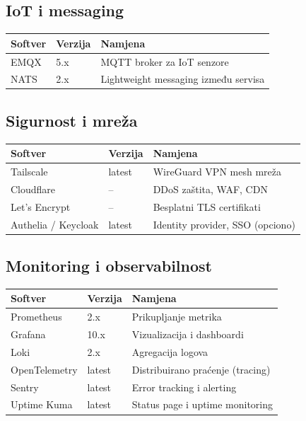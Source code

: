 \documentclass{article}
\begin{document}
\subsection{IoT i messaging}

\begin{center}
\begin{tabular}{|l|l|l|}
\hline
\rowcolor{lightgray}
\textbf{Softver} & \textbf{Verzija} & \textbf{Namjena} \\
\hline
EMQX & 5.x & MQTT broker za IoT senzore \\
\hline
NATS & 2.x & Lightweight messaging između servisa \\
\hline
\end{tabular}
\end{center}

\subsection{Sigurnost i mreža}

\begin{center}
\begin{tabular}{|l|l|l|}
\hline
\rowcolor{lightgray}
\textbf{Softver} & \textbf{Verzija} & \textbf{Namjena} \\
\hline
Tailscale & latest & WireGuard VPN mesh mreža \\
\hline
Cloudflare & -- & DDoS zaštita, WAF, CDN \\
\hline
Let's Encrypt & -- & Besplatni TLS certifikati \\
\hline
Authelia / Keycloak & latest & Identity provider, SSO (opciono) \\
\hline
\end{tabular}
\end{center}

\subsection{Monitoring i observabilnost}

\begin{center}
\begin{tabular}{|l|l|l|}
\hline
\rowcolor{lightgray}
\textbf{Softver} & \textbf{Verzija} & \textbf{Namjena} \\
\hline
Prometheus & 2.x & Prikupljanje metrika \\
\hline
Grafana & 10.x & Vizualizacija i dashboardi \\
\hline
Loki & 2.x & Agregacija logova \\
\hline
OpenTelemetry & latest & Distribuirano praćenje (tracing) \\
\hline
Sentry & latest & Error tracking i alerting \\
\hline
Uptime Kuma & latest & Status page i uptime monitoring \\
\hline
\end{tabular}
\end{center}
\end{document}

